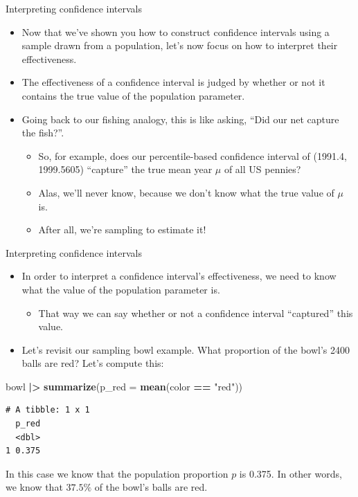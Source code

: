 \documentclass[
  ignorenonframetext,
]{beamer}
\newenvironment{Shaded}{\begin{snugshade}}{\end{snugshade}}
\newcommand{\AttributeTok}[1]{\textcolor[rgb]{0.13,0.29,0.53}{#1}}
\newcommand{\FunctionTok}[1]{\textcolor[rgb]{0.13,0.29,0.53}{\textbf{#1}}}
\newcommand{\NormalTok}[1]{#1}
\newcommand{\SpecialCharTok}[1]{\textcolor[rgb]{0.81,0.36,0.00}{\textbf{#1}}}
\newcommand{\StringTok}[1]{\textcolor[rgb]{0.31,0.60,0.02}{#1}}
\providecommand{\tightlist}{%
  \setlength{\itemsep}{0pt}\setlength{\parskip}{0pt}}
\begin{document}
\begin{frame}{Interpreting confidence intervals}
\label{interpreting-confidence-intervals-1}
\begin{itemize}
\item
  Now that we've shown you how to construct confidence intervals using a
  sample drawn from a population, let's now focus on how to interpret
  their effectiveness.
\item
  The effectiveness of a confidence interval is judged by whether or not
  it contains the true value of the population parameter.
\item
  Going back to our fishing analogy, this is like asking, ``Did our net
  capture the fish?''.

  \begin{itemize}
  \tightlist
  \item
    So, for example, does our percentile-based confidence interval of
    (1991.4, 1999.5605) ``capture'' the true mean year \(\mu\) of all US
    pennies?
  \item
    Alas, we'll never know, because we don't know what the true value of
    \(\mu\) is.
  \item
    After all, we're sampling to estimate it!
  \end{itemize}
\end{itemize}
\end{frame}

\begin{frame}[fragile]{Interpreting confidence intervals}
\label{interpreting-confidence-intervals-2}
\begin{itemize}
\item
  In order to interpret a confidence interval's effectiveness, we need
  to know what the value of the population parameter is.

  \begin{itemize}
  \tightlist
  \item
    That way we can say whether or not a confidence interval
    ``captured'' this value.
  \end{itemize}
\item
  Let's revisit our sampling bowl example. What proportion of the bowl's
  2400 balls are red? Let's compute this:
\end{itemize}

\begin{Shaded}
\begin{Highlighting}[]
\NormalTok{bowl }\SpecialCharTok{|\textgreater{}} \FunctionTok{summarize}\NormalTok{(}\AttributeTok{p\_red =} \FunctionTok{mean}\NormalTok{(color }\SpecialCharTok{==} \StringTok{"red"}\NormalTok{))}
\end{Highlighting}
\end{Shaded}

\begin{verbatim}
# A tibble: 1 x 1
  p_red
  <dbl>
1 0.375
\end{verbatim}

In this case we know that the population proportion \(p\) is 0.375. In
other words, we know that \(37.5\%\) of the bowl's balls are red.
\end{frame}
\end{document}
